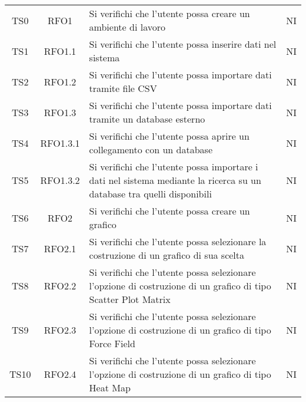 \documentclass[../piano_di_qualifica.tex]{subfiles}
\begin{document}
\begin{center}
\begin{longtable}{|c|c|p{8cm}|c|}
		TS0               & RFO1                   & Si verifichi che l'utente possa creare un ambiente di lavoro                                                              & NI                         \\
		TS1               & RFO1.1                 & Si verifichi che l'utente possa inserire dati nel sistema                                                                 & NI                         \\
		TS2               & RFO1.2                 & Si verifichi che l'utente possa importare dati tramite file CSV                                                           & NI                         \\
		TS3               & RFO1.3                 & Si verifichi che l'utente possa importare dati tramite un database esterno                                                & NI                         \\
		TS4               & RFO1.3.1               & Si verifichi che l'utente possa aprire un collegamento con un database                                                    & NI                         \\
		TS5               & RFO1.3.2               & Si verifichi che l'utente possa importare i dati nel sistema mediante la ricerca su un database tra quelli disponibili    & NI                         \\
		TS6               & RFO2                   & Si verifichi che l'utente possa creare  un grafico                                                                        & NI                         \\
		TS7               & RFO2.1                 & Si verifichi che l'utente possa selezionare la costruzione di un grafico di sua scelta                                    & NI                         \\
		TS8               & RFO2.2                 & Si verifichi che l'utente possa selezionare l'opzione di costruzione di un grafico di tipo Scatter Plot Matrix            & NI                         \\
		TS9               & RFO2.3                 & Si verifichi che l'utente possa selezionare l'opzione di costruzione di un grafico di tipo Force Field                    & NI                         \\
		TS10              & RFO2.4                 & Si verifichi che l'utente possa selezionare l'opzione di costruzione di un grafico di tipo Heat Map                       & NI                         \\

\end{longtable}
\end{center}
\end{document}
